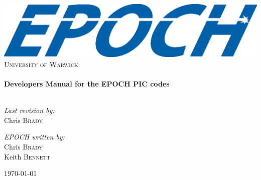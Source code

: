 \begin{titlepage}
 
\begin{center}
 
\includegraphics[width=14cm]{./images/EPOCHLogo.eps}\\[1cm]

\textsc{\LARGE University of Warwick}\\[1.5cm]
  
\HRule \\[0.4cm]
{ \huge \bfseries Developers Manual for the EPOCH PIC codes}\\[0.4cm]
 
\HRule \\[1.5cm]
 
\begin{minipage}{0.4\textwidth}
\begin{flushleft} \large
\emph{Last revision by:}\\
Chris \textsc{Brady}
\end{flushleft}
\end{minipage}
\begin{minipage}{0.4\textwidth}
\begin{flushright} \large
\emph{EPOCH written by:} \\
Chris \textsc{Brady}\\
Keith \textsc{Bennett}\\
\end{flushright}
\end{minipage}
 
\vfill
 
{\large \today}
 
\end{center}
 
\end{titlepage}
